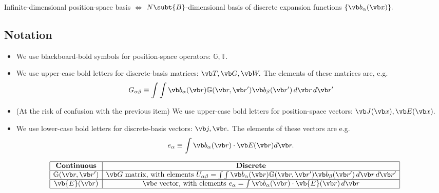\documentclass[letterpaper]{article}
\begin{document}
Infinite-dimensional position-space basis 
$\Longleftrightarrow$ 
$N\subt{B}$-dimensional basis of discrete expansion functions
$\{\vb b_\alpha(\vb x)\}.$ 

\subsection*{Notation}

\begin{itemize}
  \item We use blackboard-bold symbols for position-space 
        operators: $\mathbb{G}, \mathbb{T}$.
  \item We use upper-case bold letters for 
        discrete-basis matrices: $\vb T, \vb G, \vb W.$
        The elements of these matrices are, e.g.
        $$ G_{\alpha\beta} \equiv \int \int 
           \vb b_\alpha(\vb r) \mathbb{G}(\vb r, \vb r^\prime)
           \vb b_\beta(\vb r^\prime) \, d\vb r \, d\vb r^\prime
        $$
  \item (At the risk of confusion with the previous item) 
        We use upper-case bold letters for position-space
        vectors: $\vb J(\vb x), \vb E(\vb x).$
  \item We use lower-case bold letters for
        discrete-basis vectors: $\vb j, \vb e.$ The elements
        of these vectors are e.g.
        $$ e_{\alpha} 
           \equiv 
           \int \vb b_\alpha(\vb r) \cdot \vb E(\vb r) d\vb r.
        $$
\end{itemize}

\renewcommand{\arraystretch}{1.5}
$$\begin{array}{|c|c|}\hline
   \textbf{Continuous} 
 & \textbf{Discrete} 
\\\hline
  \mathbb{G}(\vb r, \vb r^\prime)
& 
  \vb G\text{ matrix, with elements }
  U_{\alpha\beta} 
  = \int \int \vb b_\alpha(\vb r) \mathbb{G}(\vb r, \vb r^\prime)
              \vb b_\beta(\vb r^\prime) \, d\vb r \, d\vb r^\prime
\\\hline
  \vb{E}(\vb r)
&
  \vb e\text{ vector, with elements }
  e_{\alpha} 
  = \int \vb b_\alpha(\vb r) \cdot \vb {E}(\vb r) \, d\vb r
\\\hline
\end{array}$$
\end{document}
